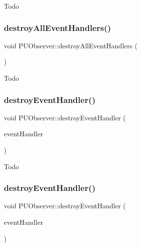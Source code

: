 Todo \mbox{\label{classPUObserver_a8fd1d6c0034cc9ff650718e3a3c667f3}} 
\subsubsection{\texorpdfstring{destroy\+All\+Event\+Handlers()}{destroyAllEventHandlers()}\hspace{0.1cm}{\footnotesize\ttfamily [2/2]}}
{\footnotesize\ttfamily void P\+U\+Observer\+::destroy\+All\+Event\+Handlers (\begin{DoxyParamCaption}\item[{void}]{ }\end{DoxyParamCaption})}

Todo \mbox{\label{classPUObserver_ab9a8d586068cc43f9eed0a3440448bbc}} 
\subsubsection{\texorpdfstring{destroy\+Event\+Handler()}{destroyEventHandler()}\hspace{0.1cm}{\footnotesize\ttfamily [1/4]}}
{\footnotesize\ttfamily void P\+U\+Observer\+::destroy\+Event\+Handler (\begin{DoxyParamCaption}\item[{\hyperlink{classPUEventHandler}{P\+U\+Event\+Handler} $\ast$}]{event\+Handler }\end{DoxyParamCaption})}

Todo \mbox{\label{classPUObserver_ab9a8d586068cc43f9eed0a3440448bbc}} 
\subsubsection{\texorpdfstring{destroy\+Event\+Handler()}{destroyEventHandler()}\hspace{0.1cm}{\footnotesize\ttfamily [2/4]}}
{\footnotesize\ttfamily void P\+U\+Observer\+::destroy\+Event\+Handler (\begin{DoxyParamCaption}\item[{\hyperlink{classPUEventHandler}{P\+U\+Event\+Handler} $\ast$}]{event\+Handler }\end{DoxyParamCaption})}

